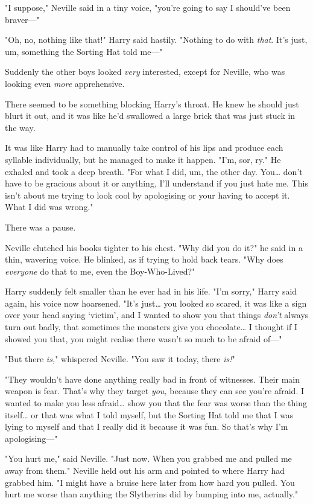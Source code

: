 "I suppose," Neville said in a tiny voice, "you're going to say I should've 
been braver---"

"Oh, no, nothing like that!" Harry said hastily. "Nothing to do with 
\emph{that}. It's just, um, something the Sorting Hat told me---"

Suddenly the other boys looked \emph{very} interested, except for Neville, who 
was looking even \emph{more} apprehensive.

There seemed to be something blocking Harry's throat. He knew he should just 
blurt it out, and it was like he'd swallowed a large brick that was just stuck 
in the way.

It was like Harry had to manually take control of his lips and produce each 
syllable individually, but he managed to make it happen. "I'm, sor, ry." He 
exhaled and took a deep breath. "For what I did, um, the other day. You{\ldots} 
don't have to be gracious about it or anything, I'll understand if you just 
hate me. This isn't about me trying to look cool by apologising or your having 
to accept it. What I did was wrong."

There was a pause.

Neville clutched his books tighter to his chest. "Why did you do it?" he said 
in a thin, wavering voice. He blinked, as if trying to hold back tears. "Why 
does \emph{everyone} do that to me, even the Boy-Who-Lived?"

Harry suddenly felt smaller than he ever had in his life. "I'm sorry," Harry 
said again, his voice now hoarsened. "It's just{\ldots} you looked so scared, 
it was like a sign over your head saying `victim', and I wanted to show you 
that things \emph{don't} always turn out badly, that sometimes the monsters 
give you chocolate{\ldots} I thought if I showed you that, you might realise 
there wasn't so much to be afraid of---"

"But there \emph{is,}" whispered Neville. "You saw it today, there \emph{is!}"

"They wouldn't have done anything really bad in front of witnesses. Their main 
weapon is fear. That's why they target \emph{you,} because they can see you're 
afraid. I wanted to make you less afraid{\ldots} show you that the fear was 
worse than the thing itself{\ldots} or that was what I told myself, but the 
Sorting Hat told me that I was lying to myself and that I really did it because 
it was fun. So that's why I'm apologising---"

"You hurt me," said Neville. "Just now. When you grabbed me and pulled me away 
from them." Neville held out his arm and pointed to where Harry had grabbed 
him. "I might have a bruise here later from how hard you pulled. You hurt me 
worse than anything the Slytherins did by bumping into me, actually."

